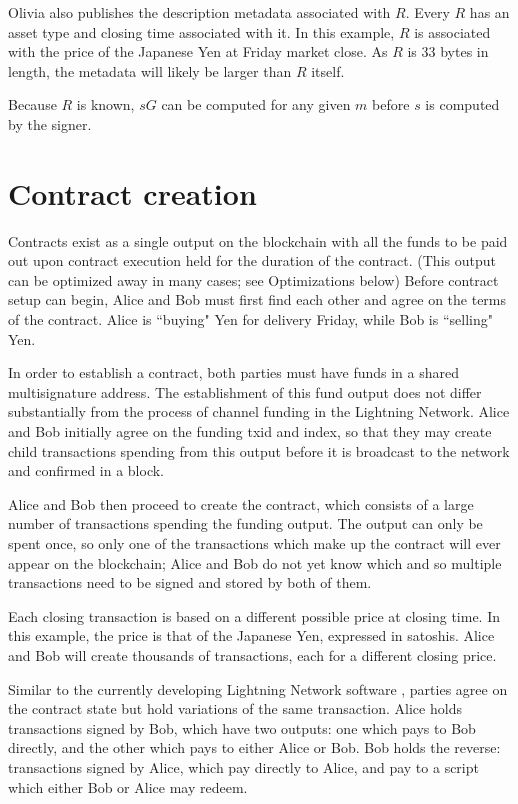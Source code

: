 \documentclass[10pt]{article}
\begin{document}
Olivia also publishes the description metadata associated with \(R\).  Every \(R\) has an asset type and closing time associated with it.  In this example, \(R\) is associated with the price of the Japanese Yen at Friday market close.  As \(R\) is 33 bytes in length, the metadata will likely be larger than \(R\) itself.

Because \(R\) is known, \(sG\) can be computed for any given \(m\) before \(s\) is computed by the signer.

\section*{Contract creation}

Contracts exist as a single output on the blockchain with all the funds to be paid out upon contract execution held for the duration of the contract.  (This output can be optimized away in many cases; see Optimizations below)  Before contract setup can begin, Alice and Bob must first find each other and agree on the terms of the contract.  Alice is ``buying" Yen for delivery Friday, while Bob is ``selling" Yen.

In order to establish a contract, both parties must have funds in a shared multisignature address.  The establishment of this fund output does not differ substantially from the process of channel funding in the Lightning Network.  Alice and Bob initially agree on the funding txid and index, so that they may create child transactions spending from this output before it is broadcast to the network and confirmed in a block.

Alice and Bob then proceed to create the contract, which consists of a large number of transactions spending the funding output.  The output can only be spent once, so only one of the transactions which make up the contract will ever appear on the blockchain; Alice and Bob do not yet know which and so multiple transactions need to be signed and stored by both of them.

Each closing transaction is based on a different possible price at closing time.  In this example, the price is that of the Japanese Yen, expressed in satoshis.  Alice and Bob will create thousands of transactions, each for a different closing price.  

Similar to the currently developing Lightning Network software \cite{lnpaper}, parties agree on the contract state but hold variations of the same transaction.  Alice holds transactions signed by Bob, which have two outputs: one which pays to Bob directly, and the other which pays to either Alice or Bob.  Bob holds the reverse: transactions signed by Alice, which pay directly to Alice, and pay to a script which either Bob or Alice may redeem.
\end{document}
